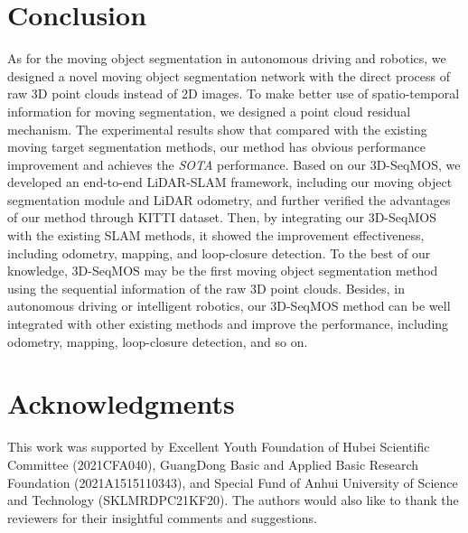 \documentclass[lettersize,journal]{IEEEtran}
\begin{document}
\section{Conclusion}
As for the moving object segmentation in autonomous driving and robotics, we designed a novel moving object segmentation network with the direct process of raw 3D point clouds instead of 2D images. To make better use of spatio-temporal information for moving segmentation, we designed a point cloud residual mechanism. The experimental results show that compared with the existing moving target segmentation methods, our method has obvious performance improvement and achieves the \emph{SOTA} performance. Based on our 3D-SeqMOS, we developed an end-to-end LiDAR-SLAM framework, including our moving object segmentation module and LiDAR odometry, and further verified the advantages of our method through KITTI dataset. Then, by integrating our 3D-SeqMOS with the existing SLAM methods, it showed the improvement effectiveness, including odometry, mapping, and loop-closure detection. To the best of our knowledge, 3D-SeqMOS may be the first moving object segmentation method using the sequential information of the raw 3D point clouds. Besides, in autonomous driving or intelligent robotics, our 3D-SeqMOS method can be well integrated with other existing methods and improve the performance, including odometry, mapping, loop-closure detection, and so on.


\section*{Acknowledgments}
This work was supported by Excellent Youth Foundation of Hubei Scientific Committee (2021CFA040), GuangDong Basic and Applied Basic Research Foundation (2021A1515110343), and Special Fund of Anhui University of Science and Technology (SKLMRDPC21KF20). The authors would also like to thank the reviewers for their insightful comments and suggestions.


\end{document}
